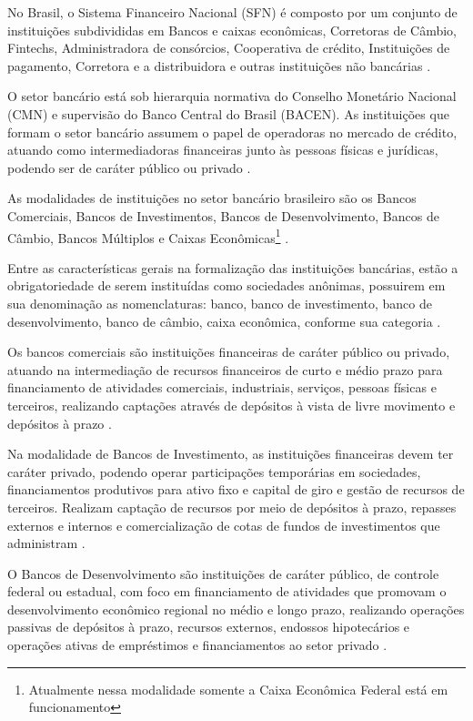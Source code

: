 \documentclass[12pt,12pt,openright,oneside,a4paper,chapter=TITLE,section=TITLE,subsection=TITLE,subsubsection=TITLE,english,french,spanish,portugues,sumario=tradicional]{abntex2}
\begin{document}
No Brasil, o Sistema Financeiro Nacional (SFN) é composto por um conjunto de instituições subdivididas em Bancos e caixas econômicas, Corretoras de Câmbio, Fintechs, Administradora de consórcios, Cooperativa de crédito, Instituições de pagamento, Corretora e a distribuidora e outras instituições não bancárias \cite{Lei:4595:1964}.

O setor bancário está sob hierarquia normativa do Conselho Monetário Nacional (CMN) e supervisão do Banco Central do Brasil (BACEN). As instituições que formam o setor bancário assumem o papel de operadoras no mercado de crédito, atuando como intermediadoras financeiras junto às pessoas físicas e jurídicas, podendo ser de caráter público ou privado \cite{Lei:4595:1964}.

As modalidades de instituições no setor bancário brasileiro são os Bancos
Comerciais, Bancos de Investimentos, Bancos de Desenvolvimento, Bancos de
Câmbio, Bancos Múltiplos e Caixas Econômicas\footnote{Atualmente nessa
modalidade somente a Caixa Econômica Federal está em funcionamento}
\cite{Lei:4595:1964} \cite{Res:2099:1994} \cite{Res:2624:1999} \cite{Res:394:1976} \cite{Res:3426:2006} \cite{DL:759:1969}.

Entre as características gerais na formalização das instituições bancárias, estão a obrigatoriedade de serem instituídas como sociedades anônimas, possuirem em sua denominação as nomenclaturas: banco, banco de investimento, banco de desenvolvimento, banco de câmbio, caixa econômica, conforme sua categoria \cite{Lei:4595:1964} \cite{Res:2099:1994} \cite{Res:2624:1999} \cite{Res:394:1976} \cite{Res:3426:2006} \cite{DL:759:1969}.

Os bancos comerciais são instituições financeiras de caráter público ou privado, atuando na intermediação de recursos financeiros de curto e médio prazo para financiamento de atividades comerciais, industriais, serviços, pessoas físicas e terceiros, realizando captações através de depósitos à vista de livre movimento e depósitos à prazo \cite{Res:2099:1994}.

Na modalidade de Bancos de Investimento, as instituições financeiras devem ter
caráter privado, podendo operar participações temporárias em sociedades,
financiamentos produtivos para ativo fixo e capital de giro e gestão de
recursos de terceiros. Realizam captação de recursos por meio de depósitos à
prazo, repasses externos e internos e comercialização de cotas de fundos de
investimentos que administram \cite{Res:2624:1999}.

O Bancos de Desenvolvimento são instituições de caráter público, de controle federal ou estadual, com foco em financiamento de atividades que promovam o desenvolvimento econômico regional no médio e longo prazo, realizando operações passivas de depósitos à prazo, recursos externos, endossos hipotecários e operações ativas de empréstimos e financiamentos ao setor privado \cite{Res:394:1976}.
\end{document}

